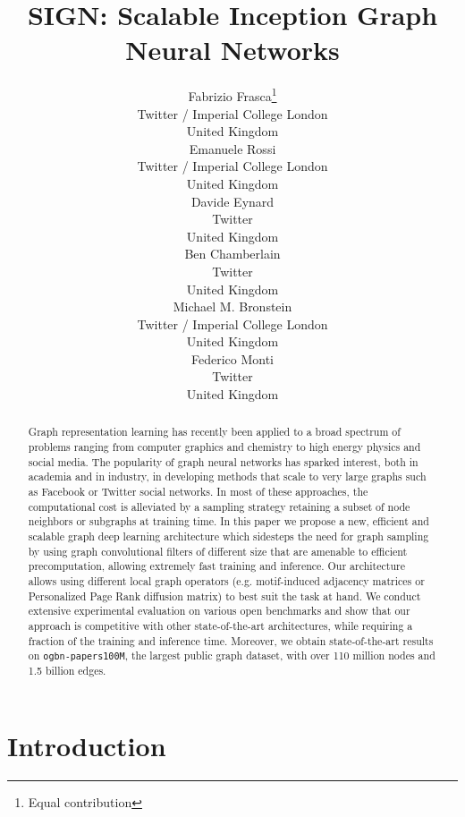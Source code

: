 \documentclass{article}
\title{SIGN: Scalable Inception Graph Neural Networks}
\author{Fabrizio Frasca\thanks{Equal contribution} \\
   Twitter / Imperial College London \\
   United Kingdom\\
\And
  Emanuele Rossi\samethanks \\
   Twitter / Imperial College London \\
   United Kingdom\\   
\And
   Davide Eynard \\
   Twitter \\
   United Kingdom\\   
\AND
   Ben Chamberlain \\
   Twitter \\
   United Kingdom\\   
\And
   Michael M. Bronstein \\
   Twitter / Imperial College London\\
   United Kingdom\\   
\And
   Federico Monti \\
   Twitter \\
   United Kingdom\\   
}
\begin{document}
\hspace{-5cm}

\maketitle

\begin{abstract}
Graph representation learning has recently been applied to a broad spectrum of problems ranging from computer graphics and chemistry to high energy physics and social media. 
The popularity of graph neural networks has sparked interest, both in academia and in industry, in developing methods that scale to very large graphs such as Facebook or Twitter social networks. In most of these approaches, the computational cost is alleviated by a sampling strategy retaining a subset of node neighbors or subgraphs at training time.
In this paper we propose a new, efficient and scalable graph deep learning architecture which sidesteps the need for graph sampling by using graph convolutional filters of different size that are amenable to efficient precomputation, allowing extremely fast training and inference. 
Our architecture allows using different local graph operators (e.g. motif-induced adjacency matrices or  Personalized Page Rank diffusion matrix) to best suit the task at hand.
We conduct extensive experimental evaluation on various open benchmarks and show that our approach is competitive with other state-of-the-art architectures, while requiring a fraction of the training and inference time. Moreover, we obtain state-of-the-art results on \texttt{ogbn-papers100M}, the largest public graph dataset, with over 110 million nodes and 1.5 billion edges.
\end{abstract}







\maketitle

\section{Introduction}
\end{document}

